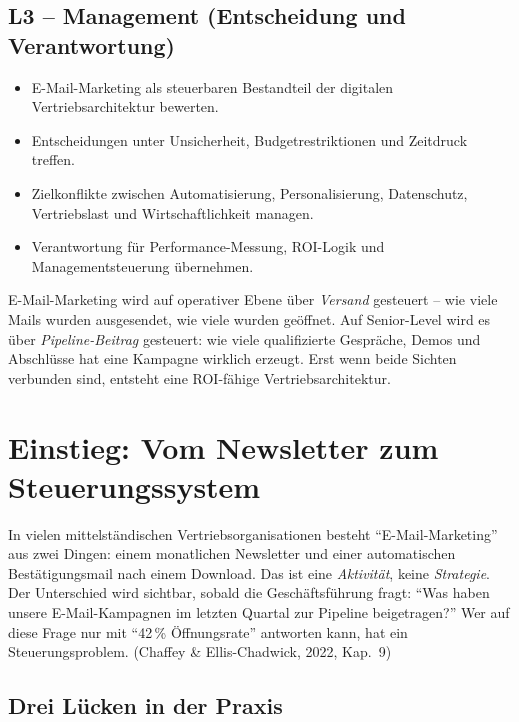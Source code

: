 \documentclass[11pt,a4paper,oneside]{article}
\newcommand{\quelle}[1]{{\footnotesize\color{lpGray}(#1)}}
\begin{document}
\subsection*{L3 -- Management (Entscheidung und Verantwortung)}
\begin{itemize}
  \item E-Mail-Marketing als steuerbaren Bestandteil der digitalen Vertriebsarchitektur bewerten.
  \item Entscheidungen unter Unsicherheit, Budgetrestriktionen und Zeitdruck treffen.
  \item Zielkonflikte zwischen Automatisierung, Personalisierung, Datenschutz, Vertriebslast und Wirtschaftlichkeit managen.
  \item Verantwortung für Performance-Messung, ROI-Logik und Managementsteuerung übernehmen.
\end{itemize}

\begin{merkbox}
E-Mail-Marketing wird auf operativer Ebene über \emph{Versand} gesteuert -- wie viele Mails wurden ausgesendet, wie viele wurden geöffnet. Auf Senior-Level wird es über \emph{Pipeline-Beitrag} gesteuert: wie viele qualifizierte Gespräche, Demos und Abschlüsse hat eine Kampagne wirklich erzeugt. Erst wenn beide Sichten verbunden sind, entsteht eine ROI-fähige Vertriebsarchitektur.
\end{merkbox}

\clearpage

\section{Einstieg: Vom Newsletter zum Steuerungssystem}

In vielen mittelständischen Vertriebsorganisationen besteht ``E-Mail-Marketing'' aus zwei Dingen: einem monatlichen Newsletter und einer automatischen Bestätigungsmail nach einem Download. Das ist eine \emph{Aktivität}, keine \emph{Strategie}. Der Unterschied wird sichtbar, sobald die Geschäftsführung fragt: ``Was haben unsere E-Mail-Kampagnen im letzten Quartal zur Pipeline beigetragen?'' Wer auf diese Frage nur mit ``42\,\% Öffnungsrate'' antworten kann, hat ein Steuerungsproblem. \quelle{Chaffey \& Ellis-Chadwick, 2022, Kap.~9}

\subsection{Drei Lücken in der Praxis}
\end{document}
